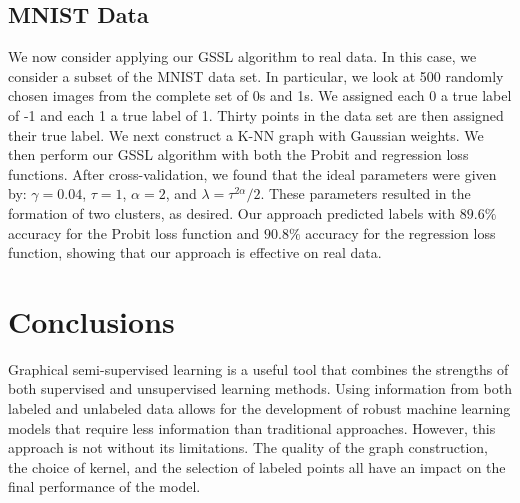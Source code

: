 \documentclass[12pt]{amsart}
\begin{document}
\subsection{MNIST Data}
We now consider applying our GSSL algorithm to real data. In this case, we consider a subset of the MNIST data set. In particular, we look at 500 randomly chosen images from the complete set of 0s and 1s. We assigned each 0 a true label of -1 and each 1 a true label of 1. Thirty points in the data set are then assigned their true label. We next construct a K-NN graph with Gaussian weights. We then perform our GSSL algorithm with both the Probit and regression loss functions. After cross-validation, we found that the ideal parameters were given by: $\gamma=0.04$, $\tau=1$, $\alpha=2$, and $\lambda=\tau^{2\alpha}/2$. These parameters resulted in the formation of two clusters, as desired. Our approach predicted labels with $89.6\%$ accuracy for the Probit loss function and $90.8\%$ accuracy for the regression loss function, showing that our approach is effective on real data.

\section{Conclusions}
Graphical semi-supervised learning is a useful tool that combines the strengths of both supervised and unsupervised learning methods. Using information from both labeled and unlabeled data allows for the development of robust machine learning models that require less information than traditional approaches. However, this approach is not without its limitations. The quality of the graph construction, the choice of kernel, and the selection of labeled points all have an impact on the final performance of the model.

\nocite{hoffmann, borovitskiy, sanz-alonso}


\end{document}
